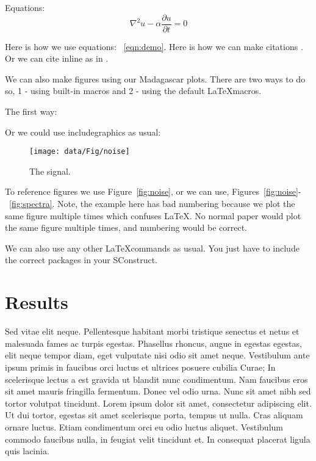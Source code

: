 Equations:
\begin{equation}
    \nabla^2 u - \alpha \frac{\partial u}{\partial t} = 0
\label{eqn:demo}
\end{equation}

Here is how we use equations: ~\ref{eqn:demo}.  Here is how we can make citations \cite[]{godwin_blended_2010,krebs_fast_2009,duquet_3d_1999}. Or we can cite inline as in \cite{godwin_blended_2010}.

We can also make figures using our Madagascar plots.  There are two ways to do so, 1 - using built-in macros and 2 - using the default \LaTeX macros.

The first way:



Or we could use includegraphics as usual:

\begin{figure}
    \texttt{[image: data/Fig/noise]} 
    \caption{The signal.}
\label{Fig:noise}
\end{figure}

To reference figures we use Figure~\ref{fig:noise}, or we can use, Figures~\ref{fig:noise}-~\ref{fig:spectra}. Note, the example here has bad numbering because we plot the same figure multiple times which confuses \LaTeX.  No normal paper would plot the same figure multiple times, and numbering would be correct.

We can also use any other \LaTeX commands as usual.  You just have to include the correct packages in your SConstruct.

\section{Results}

Sed vitae elit neque. Pellentesque habitant morbi tristique senectus et netus et malesuada fames ac turpis egestas. Phasellus rhoncus, augue in egestas egestas, elit neque tempor diam, eget vulputate nisi odio sit amet neque. Vestibulum ante ipsum primis in faucibus orci luctus et ultrices posuere cubilia Curae; In scelerisque lectus a est gravida ut blandit nunc condimentum. Nam faucibus eros sit amet mauris fringilla fermentum. Donec vel odio urna. Nunc sit amet nibh sed tortor volutpat tincidunt. Lorem ipsum dolor sit amet, consectetur adipiscing elit. Ut dui tortor, egestas sit amet scelerisque porta, tempus ut nulla. Cras aliquam ornare luctus. Etiam condimentum orci eu odio luctus aliquet. Vestibulum commodo faucibus nulla, in feugiat velit tincidunt et. In consequat placerat ligula quis lacinia.

